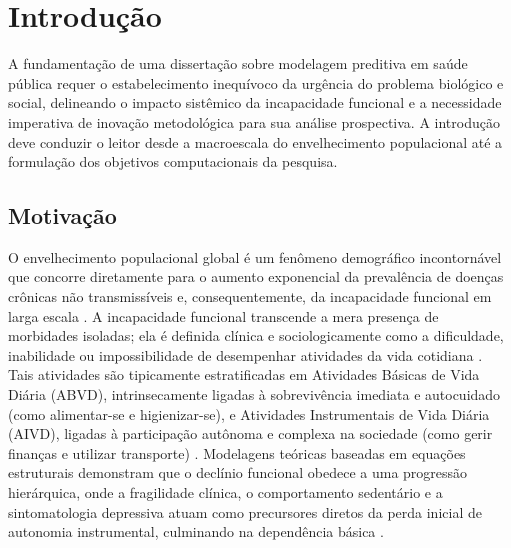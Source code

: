 \documentclass[12pt,openright,oneside,a4paper,brazil]{abntex2}
\begin{document}
\imprimircapa
\imprimirfolhaderosto

\tableofcontents*
\cleardoublepage

\textual

\chapter{Introdução}

A fundamentação de uma dissertação sobre modelagem preditiva em saúde pública requer o estabelecimento inequívoco da urgência do problema biológico e social, delineando o impacto sistêmico da incapacidade funcional e a necessidade imperativa de inovação metodológica para sua análise prospectiva. A introdução deve conduzir o leitor desde a macroescala do envelhecimento populacional até a formulação dos objetivos computacionais da pesquisa.

\section{Motivação}
O envelhecimento populacional global é um fenômeno demográfico incontornável que concorre diretamente para o aumento exponencial da prevalência de doenças crônicas não transmissíveis e, consequentemente, da incapacidade funcional em larga escala \cite{ref1}. A incapacidade funcional transcende a mera presença de morbidades isoladas; ela é definida clínica e sociologicamente como a dificuldade, inabilidade ou impossibilidade de desempenhar atividades da vida cotidiana \cite{ref2, ref3}. Tais atividades são tipicamente estratificadas em Atividades Básicas de Vida Diária (ABVD), intrinsecamente ligadas à sobrevivência imediata e autocuidado (como alimentar-se e higienizar-se), e Atividades Instrumentais de Vida Diária (AIVD), ligadas à participação autônoma e complexa na sociedade (como gerir finanças e utilizar transporte) \cite{ref2, ref3}. Modelagens teóricas baseadas em equações estruturais demonstram que o declínio funcional obedece a uma progressão hierárquica, onde a fragilidade clínica, o comportamento sedentário e a sintomatologia depressiva atuam como precursores diretos da perda inicial de autonomia instrumental, culminando na dependência básica \cite{ref4}. 
\end{document}
